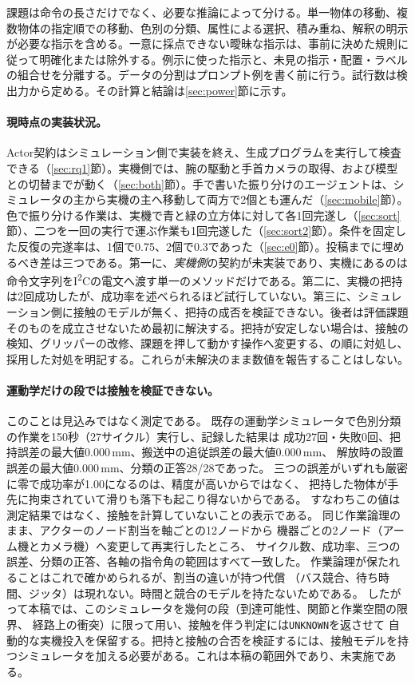 \documentclass[10pt,letterpaper]{article}
\begin{document}
課題は命令の長さだけでなく、必要な推論によって分ける。単一物体の移動、複数物体の指定順での移動、色別の分類、属性による選択、積み重ね、解釈の明示が必要な指示を含める。一意に採点できない曖昧な指示は、事前に決めた規則に従って明確化または除外する。例示に使った指示と、未見の指示・配置・ラベルの組合せを分離する。データの分割はプロンプト例を書く前に行う。試行数は検出力から定める。その計算と結論は\ref{sec:power}節に示す。

\paragraph{現時点の実装状況。}Actor契約はシミュレーション側で実装を終え、生成プログラムを実行して検査できる（\ref{sec:rq1}節）。実機側では、腕の駆動と手首カメラの取得、および模型との切替までが動く（\ref{sec:both}節）。手で書いた振り分けのエージェントは、シミュレータの主から実機の主へ移動して両方で2個とも運んだ（\ref{sec:mobile}節）。色で振り分ける作業は、実機で青と緑の立方体に対して各1回完遂し（\ref{sec:sort}節）、二つを一回の実行で運ぶ作業も1回完遂した（\ref{sec:sort2}節）。条件を固定した反復の完遂率は、1個で0.75、2個で0.3であった（\ref{sec:e0}節）。投稿までに埋めるべき差は三つである。第一に、\emph{実機側}の契約が未実装であり、実機にあるのは命令文字列をI\textsuperscript{2}Cの電文へ渡す単一のメソッドだけである。第二に、実機の把持は2回成功したが、成功率を述べられるほど試行していない。第三に、シミュレーション側に接触のモデルが無く、把持の成否を検証できない。後者は評価課題そのものを成立させないため最初に解決する。把持が安定しない場合は、接触の検知、グリッパーの改修、課題を押して動かす操作へ変更する、の順に対処し、採用した対処を明記する。これらが未解決のまま数値を報告することはしない。

\paragraph{運動学だけの段では接触を検証できない。}このことは見込みではなく測定である。
既存の運動学シミュレータで色別分類の作業を150秒（27サイクル）実行し、記録した結果は
成功27回・失敗0回、把持誤差の最大値$0.000$\,mm、搬送中の追従誤差の最大値$0.000$\,mm、
解放時の設置誤差の最大値$0.000$\,mm、分類の正答28/28であった。
三つの誤差がいずれも厳密に零で成功率が1.00になるのは、精度が高いからではなく、
把持した物体が手先に拘束されていて滑りも落下も起こり得ないからである。
すなわちこの値は測定結果ではなく、接触を計算していないことの表示である。
%
同じ作業論理のまま、アクターのノード割当を軸ごとの12ノードから
機器ごとの2ノード（アーム機とカメラ機）へ変更して再実行したところ、
サイクル数、成功率、三つの誤差、分類の正答、各軸の指令角の範囲はすべて一致した。
作業論理が保たれることはこれで確かめられるが、割当の違いが持つ代償
（バス競合、待ち時間、ジッタ）は現れない。時間と競合のモデルを持たないためである。
%
したがって本稿では、このシミュレータを幾何の段（到達可能性、関節と作業空間の限界、
経路上の衝突）に限って用い、接触を伴う判定には\texttt{UNKNOWN}を返させて
自動的な実機投入を保留する。把持と接触の合否を検証するには、接触モデルを持つシミュレータを加える必要がある。これは本稿の範囲外であり、未実施である。
\end{document}
